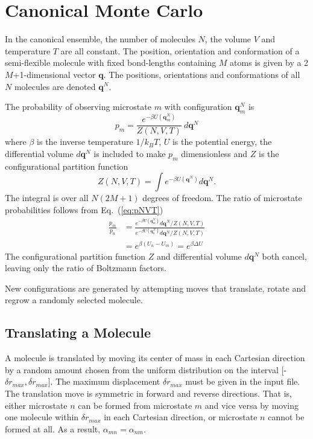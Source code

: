 \section{Canonical Monte Carlo}
\label{sec:NVT}
In the canonical ensemble, the number of molecules $N$, the volume $V$ and temperature $T$ are all constant. The position, orientation and conformation of a semi-flexible molecule with fixed bond-lengths containing $M$ atoms is given by a 2$M$+1-dimensional vector $\mathbf{q}$. The positions, orientations and conformations of all $N$ molecules are denoted $\mathbf{q}^N$.

The probability of observing microstate $m$ with configuration $\mathbf{q}_m^N$ is
\begin{equation}
\label{eq:pNVT}
p_m = \frac{e^{-\beta U\left(\mathbf{q}_m^N\right)}}{Z(N,V,T)}\ d\mathbf{q}^N
\end{equation}
where $\beta$ is the inverse temperature $1/k_BT$, $U$ is the potential energy, the differential volume $d\mathbf{q}^N$ is included to make $p_m$ dimensionless and $Z$ is the configurational partition function
\begin{equation}
\label{eq:configPartitionFn_NVT}
Z(N,V,T) = \int e^{-\beta U(\mathbf{q}^N)} d\mathbf{q}^N.
\end{equation}
The integral is over all $N(2M+1)$ degrees of freedom. The ratio of microstate probabilities follows from Eq.\ (\ref{eq:pNVT})
\begin{align}
\label{eq:pNVT_ratio}
\frac{p_m}{p_n} &= \frac{e^{-\beta U\left(\mathbf{q}_m^N\right)} d\mathbf{q}^N/Z(N,V,T)}{e^{-\beta U\left(\mathbf{q}_n^N\right)} d\mathbf{q}^N/Z(N,V,T)} \nonumber \\
&= e^{\beta (U_n - U_m)} = e^{\beta \Delta U}
\end{align}
The configurational partition function $Z$ and differential volume $d\mathbf{q}^N$ both cancel, leaving only the ratio of Boltzmann factors.

New configurations are generated by attempting moves that translate, rotate and regrow a randomly selected molecule.

\subsection{Translating a Molecule}
\label{sec:translate}
A molecule is translated by moving its center of mass in each Cartesian direction by a random amount chosen from the uniform distribution on the interval [-$\delta r_{max},\delta r_{max}$]. The maximum displacement $\delta r_{max}$ must be given in the input file. The translation move is symmetric in forward and reverse directions. That is, either microstate $n$ can be formed from microstate $m$ and vice versa by moving one molecule within $\delta r_{max}$ in each Cartesian direction, or microstate $n$ cannot be formed at all. As a result, $\alpha_{mn} = \alpha_{nm}$.

